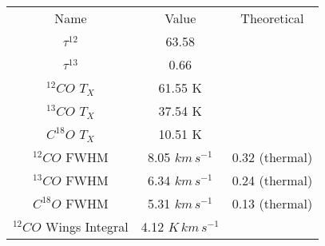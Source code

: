 \begin{table}
\begin{tabular}{ccc}
Name & Value & Theoretical \\
$\tau^{12}$ & 63.58 &  \\
$\tau^{13}$ & 0.66 &  \\
$^{12}CO$ $T_{X}$ & 61.55 K &  \\
$^{13}CO$ $T_{X}$ & 37.54 K &  \\
$C^{18}O$ $T_{X}$ & 10.51 K &  \\
$^{12}CO$ FWHM & 8.05 $km\,s^{-1}$ & 0.32 (thermal) \\
$^{13}CO$ FWHM & 6.34 $km\,s^{-1}$ & 0.24 (thermal) \\
$C^{18}O$ FWHM & 5.31 $km\,s^{-1}$ & 0.13 (thermal) \\
$^{12}CO$ Wings Integral & 4.12 $K\,km\,s^{-1}$ &  \\
\end{tabular}
\end{table}
